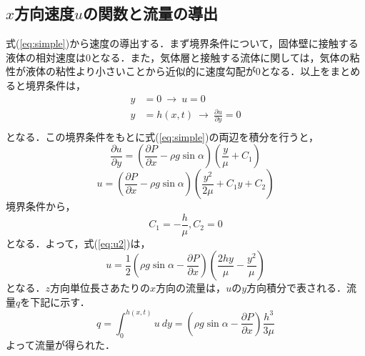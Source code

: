 \documentclass[autodetect-engine,dvipdfmx-if-dvi,ja=standard,a4paper,11pt]{bxjsarticle} %
\begin{document}
\subsection{$x$方向速度$u$の関数と流量の導出}
式(\ref{eq:simple})から速度の導出する．まず境界条件について，固体壁に接触する液体の相対速度は0となる．また，気体層と接触する流体に関しては，気体の粘性が液体の粘性より小さいことから近似的に速度勾配が0となる．以上をまとめると境界条件は，
\begin{equation}
\begin{split}
y&=0\ \rightarrow\ u=0\\
y&=h(x,t)\ \rightarrow\ 
\frac{\partial u}{\partial y}=0\\
\end{split}
\label{eq:BC1}
\end{equation}
となる．この境界条件をもとに式(\ref{eq:simple})の両辺を積分を行うと，
\begin{equation}
\frac{\partial u}{\partial y}=\left(\frac{\partial P}{\partial x}-\rho g\sin\alpha\right)\left(\frac{y}{\mu}+C_1\right)
\label{eq:u1}
\end{equation}
\begin{equation}
u=\left(\frac{\partial P}{\partial x}-\rho g\sin\alpha\right)\left(\frac{y^2}{2\mu}+C_1y+C_2\right)
\label{eq:u2}
\end{equation}
境界条件から，
\begin{equation}
C_1=-\frac{h}{\mu},C_2=0
\label{eq:u3}
\end{equation}
となる．よって，式(\ref{eq:u2})は，
\begin{equation}
u=\frac{1}{2}\left(\rho g\sin\alpha-\frac{\partial P}{\partial x}\right)\left(\frac{2hy}{\mu}-\frac{y^2}{\mu}\right)
\label{eq:u4}
\end{equation}
となる．$z$方向単位長さあたりの$x$方向の流量は，$u$の$y$方向積分で表される．流量$q$を下記に示す．
\begin{equation}
q=\displaystyle\int_{0}^{h(x,t)}u\ dy=\left(\rho g\sin\alpha-\frac{\partial P}{\partial x}\right)\frac{h^3}{3\mu}
\label{eq:q}
\end{equation}
よって流量が得られた．
\end{document}
